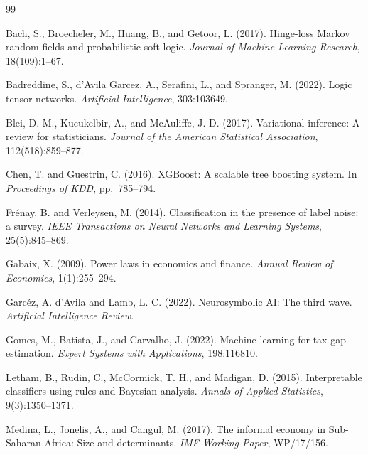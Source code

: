 \documentclass[letterpaper]{article}
\begin{document}

\begin{thebibliography}{99}

Bach, S., Broecheler, M., Huang, B., and Getoor, L. (2017).
Hinge-loss Markov random fields and probabilistic soft logic.
\textit{Journal of Machine Learning Research}, 18(109):1--67.

Badreddine, S., d'Avila Garcez, A., Serafini, L., and Spranger, M. (2022).
Logic tensor networks.
\textit{Artificial Intelligence}, 303:103649.

Blei, D. M., Kucukelbir, A., and McAuliffe, J. D. (2017).
Variational inference: A review for statisticians.
\textit{Journal of the American Statistical Association}, 112(518):859--877.

Chen, T. and Guestrin, C. (2016).
{XGBoost}: A scalable tree boosting system.
In \textit{Proceedings of KDD}, pp.\ 785--794.

Fr{\'e}nay, B. and Verleysen, M. (2014).
Classification in the presence of label noise: a survey.
\textit{IEEE Transactions on Neural Networks and Learning Systems},
25(5):845--869.

Gabaix, X. (2009).
Power laws in economics and finance.
\textit{Annual Review of Economics}, 1(1):255--294.

Garc{\'e}z, A. d'Avila and Lamb, L. C. (2022).
Neurosymbolic AI: The third wave.
\textit{Artificial Intelligence Review}.

Gomes, M., Batista, J., and Carvalho, J. (2022).
Machine learning for tax gap estimation.
\textit{Expert Systems with Applications}, 198:116810.

Letham, B., Rudin, C., McCormick, T. H., and Madigan, D. (2015).
Interpretable classifiers using rules and Bayesian analysis.
\textit{Annals of Applied Statistics}, 9(3):1350--1371.

Medina, L., Jonelis, A., and Cangul, M. (2017).
The informal economy in Sub-Saharan Africa: Size and determinants.
\textit{IMF Working Paper}, WP/17/156.


\end{thebibliography}
\end{document}
